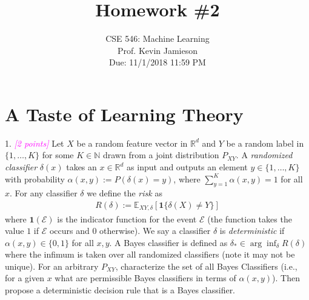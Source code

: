 \documentclass{article}
\date{{}}
\newcommand{\field}[1]{\mathbb{#1}}
\newcommand{\1}{\mathbf{1}}
\newcommand{\E}{\mathbb{E}} %
\newcommand{\R}{\field{R}} %
\newcommand{\grade}[1]{\small\textcolor{magenta}{\emph{[#1 points]}} \normalsize}
\begin{document}
\title{Homework \#2}
\author{\normalsize{CSE 546: Machine Learning}\\
\normalsize{Prof. Kevin Jamieson} \\
\normalsize{Due: 11/1/2018  11:59 PM}}
\maketitle

\section{A Taste of Learning Theory}
1. \grade{2}
Let $X$ be a random feature vector in $\R^d$ and $Y$ be a random label in $\{1,\dots,K\}$ for some $K \in \mathbb{N}$ drawn from a joint distribution $P_{XY}$. 
A \emph{randomized classifier} $\delta(x)$ takes an $x\in \R^d$ as input and outputs an element $y \in \{1,\dots,K\}$ with probability $\alpha(x,y) := P(\delta(x) = y)$, where $\sum_{y=1}^K \alpha(x,y) = 1$ for all $x$.
For any classifier $\delta$ we define the \emph{risk} as
\begin{align*}
R(\delta) := \E_{XY,\delta}[ \1\{ \delta(X) \neq Y \}]
\end{align*}
where $\1(\mathcal{E})$ is the indicator function for the event $\mathcal{E}$ (the
function takes the value $1$ if $\mathcal{E}$ occurs and $0$ otherwise).
We say a classifier $\delta$ is \emph{deterministic} if $\alpha(x,y) \in \{0,1\}$ for all $x,y$.
A Bayes classifier is defined as $\delta_* \in \arg\inf_\delta R(\delta)$ where the infimum is taken over all randomized classifiers (note it may not be unique). 
For an arbitrary $P_{XY}$, characterize the set of all Bayes Classifiers (i.e., for a given $x$ what are permissible Bayes classifiers in terms of $\alpha(x,y)$).
Then propose a deterministic decision rule that is a Bayes classifier.\\
\end{document}
